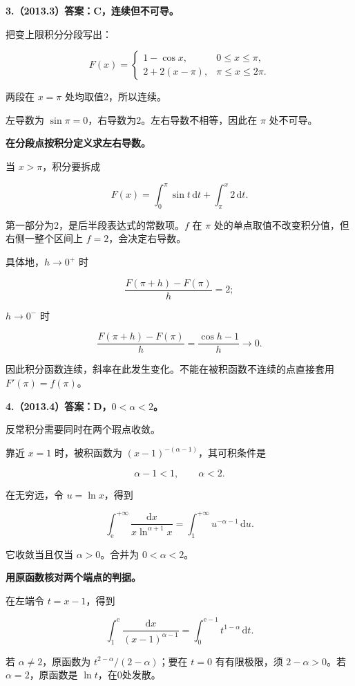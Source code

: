 \documentclass[UTF8,11pt,fontset=windows]{ctexart}
\begin{document}
\textbf{3.（2013.3）答案：C，连续但不可导。}

把变上限积分分段写出：

$$
F(x)=\begin{cases}
1-\cos x,&0\le x\le\pi,\\
2+2(x-\pi),&\pi\le x\le2\pi.
\end{cases}
$$

两段在 $x=\pi$ 处均取值2，所以连续。

左导数为 $\sin\pi=0$，右导数为2。左右导数不相等，因此在 $\pi$ 处不可导。

\textbf{在分段点按积分定义求左右导数。}

当 $x>\pi$，积分要拆成

$$
F(x)=\int_0^\pi\sin t\,\mathrm dt+\int_\pi^x2\,\mathrm dt.
$$

第一部分为2，是后半段表达式的常数项。$f$ 在 $\pi$ 处的单点取值不改变积分值，但右侧一整个区间上 $f=2$，会决定右导数。

具体地，$h\to0^+$ 时

$$
\frac{F(\pi+h)-F(\pi)}h=2;
$$

$h\to0^-$ 时

$$
\frac{F(\pi+h)-F(\pi)}h
=\frac{\cos h-1}{h}\to0.
$$

因此积分函数连续，斜率在此发生变化。不能在被积函数不连续的点直接套用 $F'(\pi)=f(\pi)$。

\clearpage

\textbf{4.（2013.4）答案：D，$0<\alpha<2$。}

反常积分需要同时在两个瑕点收敛。

靠近 $x=1$ 时，被积函数为 $(x-1)^{-(\alpha-1)}$，其可积条件是

$$
\alpha-1<1,
\qquad\alpha<2.
$$

在无穷远，令 $u=\ln x$，得到

$$
\int_{\mathrm e}^{+\infty}\frac{\mathrm dx}{x\ln^{\alpha+1}x}
=\int_1^{+\infty}u^{-\alpha-1}\,\mathrm du.
$$

它收敛当且仅当 $\alpha>0$。合并为 $0<\alpha<2$。

\textbf{用原函数核对两个端点的判据。}

在左端令 $t=x-1$，得到

$$
\int_1^{\mathrm e}\frac{\mathrm dx}{(x-1)^{\alpha-1}}
=\int_0^{\mathrm e-1}t^{1-\alpha}\,\mathrm dt.
$$

若 $\alpha\ne2$，原函数为 $t^{2-\alpha}/(2-\alpha)$；要在 $t=0$ 有有限极限，须 $2-\alpha>0$。若 $\alpha=2$，原函数是 $\ln t$，在0处发散。
\end{document}
